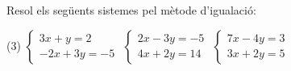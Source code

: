 \begin{mylist}
\exer  Resol els següents sistemes pel mètode d'igualació:
\begin{tasks}(3)
	\task  $\left\{\begin{array}{c} {3x+y=2} \\ {-2x+3y=-5} \end{array}\right. $  
	\task  $\left\{\begin{array}{c} {2x-3y=-5} \\ {4x+2y=14} \end{array}\right. $ 
	\task  $\left\{\begin{array}{c} {7x-4y=3} \\ {3x+2y=5} \end{array}\right. $
\end{tasks}
\answers{[$(1,-1)$, $(2,3)$, $(1,1)$]}


\end{mylist}

\begin{theorybox}
	\begin{multicols}{3}
		\centering
 \end{multicols}
\end{theorybox}
\vspace{-0.5cm}

